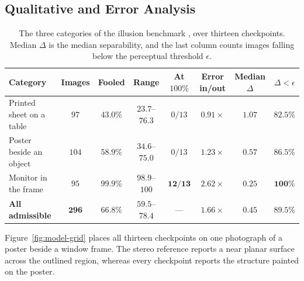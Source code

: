 \documentclass{article} %
\theoremstyle{defstyle}
\theoremstyle{plain}
\begin{document}
\subsection{Qualitative and Error Analysis}
\label{sec:res-qualitative}
\begin{table}[t]
\caption{The three categories of the illusion benchmark \citep{illusion2025}, over thirteen checkpoints. Median $\Delta$ is the median separability, and the last column counts images falling below the perceptual threshold $\epsilon$.}
\label{tab:category}
\begin{center}
\footnotesize \setlength{\tabcolsep}{3.4pt}
\begin{tabular}{lccccccc}
\toprule
\textbf{Category} & \textbf{Images} & \textbf{Fooled} & \textbf{Range} &
\textbf{At $100\%$} & \textbf{Error in/out} & \textbf{Median $\Delta$} &
\textbf{$\Delta < \epsilon$} \\
\midrule
Printed sheet on a table & $97$ & $43.0\%$ & $23.7$--$76.3$ & $0/13$ & $0.91\times$ & $1.07$ & $82.5\%$ \\
Poster beside an object & $104$ & $58.9\%$ & $34.6$--$75.0$ & $0/13$ & $1.23\times$ & $0.57$ & $86.5\%$ \\
Monitor in the frame & $95$ & $\mathbf{99.9\%}$ & $98.9$--$100$ & $\mathbf{12/13}$ & $2.62\times$ & $\mathbf{0.25}$ & $\mathbf{100\%}$ \\
\midrule
\textbf{All admissible} & $\mathbf{296}$ & $\mathbf{66.8\%}$ & $59.5$--$78.4$ & --- & $1.66\times$ & $0.45$ & $89.5\%$ \\
\bottomrule
\end{tabular}
\end{center}
\vspace{-0.8em}
\end{table}
Figure~\ref{fig:model-grid} places all thirteen checkpoints on one photograph of a poster
beside a window frame. The stereo reference reports a near planar surface across the outlined
region, whereas every checkpoint reports the structure painted on the poster.
\end{document}
